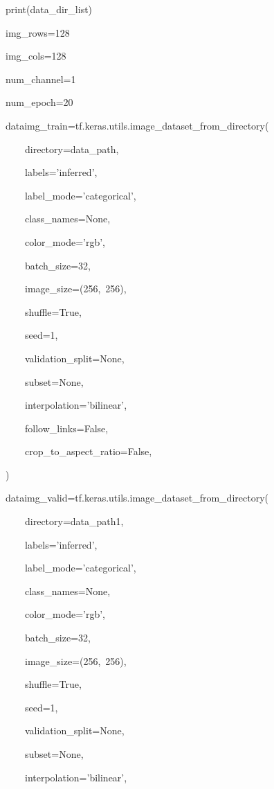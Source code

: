 \documentclass[10pt]{article} %
\begin{document}
\begin{spacing}{1.5}
\noindent print(data\_dir\_list)

\noindent img\_rows=128

\noindent img\_cols=128

\noindent num\_channel=1

\noindent num\_epoch=20

\noindent 

\noindent 

\noindent dataimg\_train=tf.keras.utils.image\_dataset\_from\_directory(

\noindent ~~~~directory=data\_path,

\noindent ~~~~labels='inferred',

\noindent ~~~~label\_mode='categorical',

\noindent ~~~~class\_names=None,

\noindent ~~~~color\_mode='rgb',

\noindent ~~~~batch\_size=32,

\noindent ~~~~image\_size=(256,~256),

\noindent ~~~~shuffle=True,

\noindent ~~~~seed=1,

\noindent ~~~~validation\_split=None,

\noindent ~~~~subset=None,

\noindent ~~~~interpolation='bilinear',

\noindent ~~~~follow\_links=False,

\noindent ~~~~crop\_to\_aspect\_ratio=False,

\noindent )

\noindent dataimg\_valid=tf.keras.utils.image\_dataset\_from\_directory(

\noindent ~~~~directory=data\_path1,

\noindent ~~~~labels='inferred',

\noindent ~~~~label\_mode='categorical',

\noindent ~~~~class\_names=None,

\noindent ~~~~color\_mode='rgb',

\noindent ~~~~batch\_size=32,

\noindent ~~~~image\_size=(256,~256),

\noindent ~~~~shuffle=True,

\noindent ~~~~seed=1,

\noindent ~~~~validation\_split=None,

\noindent ~~~~subset=None,

\noindent ~~~~interpolation='bilinear',


\end{spacing}
\end{document}
